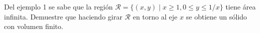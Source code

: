 \item Del ejemplo 1 se sabe que la región $\mathscr{R} = \{(x, y) \mid x \ge 1, 0 \le y \le 1/x\}$ tiene área infinita. Demuestre que haciendo girar $\mathscr{R}$ en torno al eje $x$ se obtiene un sólido con volumen finito.
